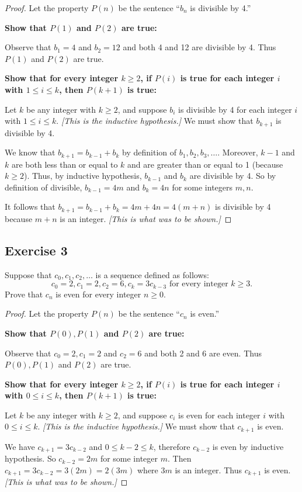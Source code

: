\documentclass[14pt]{extarticle}
\begin{document}
\begin{proof}
    Let the property $P(n)$ be the sentence “$b_n$ is divisible by 4.”

    {\bf Show that $P(1)$ and $P(2)$ are true:}

    Observe that $b_1 = 4$ and $b_2 = 12$ and both 4 and 12 are divisible by 4. Thus $P(1)$ and $P(2)$ are true.

        {\bf Show that for every integer $k \geq 2$, if $P(i)$ is true for each integer $i$ with $1 \leq i \leq k$, then $P(k + 1)$ is true:}

    Let $k$ be any integer with $k \geq 2$, and suppose $b_i$ is divisible by 4 for each integer $i$ with $1 \leq i \leq k$. {\it [This is the inductive hypothesis.]} We must show that $b_{k+1}$ is divisible by 4.

    We know that $b_{k+1} = b_{k-1} + b_k$ by definition of $b_1, b_2, b_3, \ldots$. Moreover, $k - 1$ and $k$ are both less than or equal to $k$ and are greater than or equal to 1 (because $k \geq 2$). Thus, by inductive hypothesis, $b_{k-1}$ and $b_k$ are divisible by 4. So by definition of divisible, $b_{k-1} = 4m$ and $b_k = 4n$ for some integers $m,n$.

    It follows that $b_{k+1} = b_{k-1} + b_k = 4m + 4n = 4(m+n)$ is divisible by 4 because $m+n$ is an integer. {\it [This is what was to be shown.]}
\end{proof}

\subsection{Exercise 3}
Suppose that $c_0, c_1, c_2, \ldots$ is a sequence defined
as follows:
\[
    c_0 = 2, c_1 = 2, c_2 = 6, c_k = 3c_{k-3} \text{ for every integer $k \geq 3$.}
\]
Prove that $c_n$ is even for every integer $n \geq 0$.

\begin{proof}
    Let the property $P(n)$ be the sentence “$c_n$ is even.”

    {\bf Show that $P(0), P(1)$ and $P(2)$ are true:}

    Observe that $c_0 = 2, c_1 = 2$ and $c_2 = 6$ and both 2 and 6 are even. Thus $P(0), P(1)$ and $P(2)$ are true.

        {\bf Show that for every integer $k \geq 2$, if $P(i)$ is true for each integer $i$ with $0 \leq i \leq k$, then $P(k + 1)$ is true:}

    Let $k$ be any integer with $k \geq 2$, and suppose $c_i$ is even for each integer $i$ with $0 \leq i \leq k$. {\it [This is the inductive hypothesis.]} We must show that $c_{k+1}$ is even.

    We have $c_{k+1} = 3c_{k-2}$ and $0 \leq k-2 \leq k$, therefore $c_{k-2}$ is even by inductive hypothesis. So $c_{k-2} = 2m$ for some integer $m$. Then $c_{k+1} = 3c_{k-2} = 3(2m) = 2(3m)$ where $3m$ is an integer. Thus $c_{k+1}$ is even. {\it [This is what was to be shown.]}
\end{proof}
\end{document}
